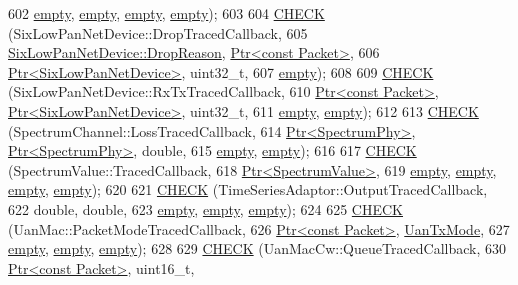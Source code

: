 \begin{DoxyCode}
602          \hyperlink{classns3_1_1empty}{empty}, \hyperlink{classns3_1_1empty}{empty}, \hyperlink{classns3_1_1empty}{empty}, \hyperlink{classns3_1_1empty}{empty});
603 
604   \hyperlink{traced-callback-typedef-test-suite_8cc_aa79806eee113005f96d9d3cb1480ce98}{CHECK} (SixLowPanNetDevice::DropTracedCallback,
605          \hyperlink{classns3_1_1SixLowPanNetDevice_a70cec96e849d8504419dab1efd94fc05}{SixLowPanNetDevice::DropReason}, 
      \hyperlink{classns3_1_1Ptr}{Ptr<const Packet>},
606          \hyperlink{classns3_1_1Ptr}{Ptr<SixLowPanNetDevice>}, uint32\_t,
607          \hyperlink{classns3_1_1empty}{empty});
608 
609   \hyperlink{traced-callback-typedef-test-suite_8cc_aa79806eee113005f96d9d3cb1480ce98}{CHECK} (SixLowPanNetDevice::RxTxTracedCallback,
610          \hyperlink{classns3_1_1Ptr}{Ptr<const Packet>}, \hyperlink{classns3_1_1Ptr}{Ptr<SixLowPanNetDevice>}, uint32\_t,
611          \hyperlink{classns3_1_1empty}{empty}, \hyperlink{classns3_1_1empty}{empty});
612 
613   \hyperlink{traced-callback-typedef-test-suite_8cc_aa79806eee113005f96d9d3cb1480ce98}{CHECK} (SpectrumChannel::LossTracedCallback,
614          \hyperlink{classns3_1_1Ptr}{Ptr<SpectrumPhy>}, \hyperlink{classns3_1_1Ptr}{Ptr<SpectrumPhy>}, \textcolor{keywordtype}{double},
615          \hyperlink{classns3_1_1empty}{empty}, \hyperlink{classns3_1_1empty}{empty});
616 
617   \hyperlink{traced-callback-typedef-test-suite_8cc_aa79806eee113005f96d9d3cb1480ce98}{CHECK} (SpectrumValue::TracedCallback,
618          \hyperlink{classns3_1_1Ptr}{Ptr<SpectrumValue>},
619          \hyperlink{classns3_1_1empty}{empty}, \hyperlink{classns3_1_1empty}{empty}, \hyperlink{classns3_1_1empty}{empty}, \hyperlink{classns3_1_1empty}{empty});
620 
621   \hyperlink{traced-callback-typedef-test-suite_8cc_aa79806eee113005f96d9d3cb1480ce98}{CHECK} (TimeSeriesAdaptor::OutputTracedCallback,
622          \textcolor{keywordtype}{double}, \textcolor{keywordtype}{double},
623          \hyperlink{classns3_1_1empty}{empty}, \hyperlink{classns3_1_1empty}{empty}, \hyperlink{classns3_1_1empty}{empty});
624 
625   \hyperlink{traced-callback-typedef-test-suite_8cc_aa79806eee113005f96d9d3cb1480ce98}{CHECK} (UanMac::PacketModeTracedCallback,
626          \hyperlink{classns3_1_1Ptr}{Ptr<const Packet>}, \hyperlink{classns3_1_1UanTxMode}{UanTxMode},
627          \hyperlink{classns3_1_1empty}{empty}, \hyperlink{classns3_1_1empty}{empty}, \hyperlink{classns3_1_1empty}{empty});
628 
629   \hyperlink{traced-callback-typedef-test-suite_8cc_aa79806eee113005f96d9d3cb1480ce98}{CHECK} (UanMacCw::QueueTracedCallback,
630          \hyperlink{classns3_1_1Ptr}{Ptr<const Packet>}, uint16\_t,

\end{DoxyCode}
